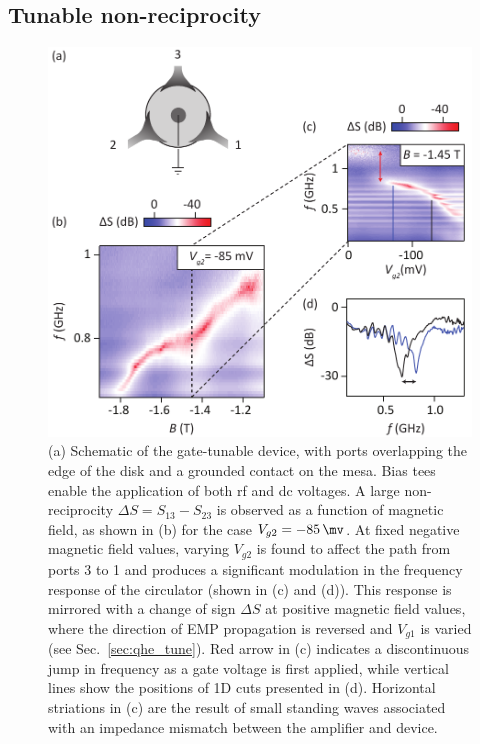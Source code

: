 \subsection{Tunable non-reciprocity}
\begin{figure}
\includegraphics[width=0.75\columnwidth]{fig5_QH}
\caption[Tunable non-reciprocity of the quantum Hall circulator]{\label{FIG. 5.}
(a) Schematic of the gate-tunable device, with ports overlapping the edge of the disk and a grounded contact on the mesa. Bias tees enable the application of both rf and dc voltages.
A large non-reciprocity $\Delta S = S_{13}-S_{23}$ is observed as a function of magnetic field, as shown in (b) for the case $V_{g2} = \SI{-85}{\mv}$.
At fixed negative magnetic field values, varying $V_{g2}$ is found to affect the path from ports 3 to 1 and produces a significant modulation in the frequency response of the circulator (shown in (c) and (d)). This response is mirrored with a change of sign $\Delta S$ at positive magnetic field values, where the direction of EMP propagation is reversed and $V_{g1}$ is varied (see Sec.~\ref{sec:qhe_tune}).  Red arrow in (c) indicates a discontinuous jump in frequency as a gate voltage is first applied, while vertical lines show the positions of 1D cuts presented in (d). Horizontal striations in (c) are the result of small standing waves associated with an impedance mismatch between the amplifier and device.}
\end{figure}

